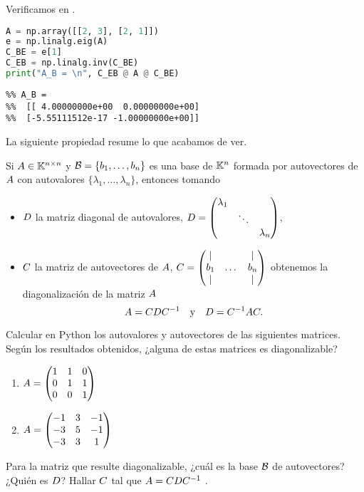 Verificamos en \python.

\begin{Shaded}
\begin{lstlisting}[language=python]
A = np.array([[2, 3], [2, 1]])
e = np.linalg.eig(A)
C_BE = e[1]
C_EB = np.linalg.inv(C_BE)
print("A_B = \n", C_EB @ A @ C_BE)
\end{lstlisting}
\end{Shaded}

\begin{verbatim}
%% A_B =
%%  [[ 4.00000000e+00  0.00000000e+00]
%%  [-5.55111512e-17 -1.00000000e+00]]
\end{verbatim}

La siguiente propiedad resume lo que acabamos de ver.

\begin{prop}
Si $\Ab \in \K^{n \times n}$ y $\B = \{\bb_1, \dots, \bb_n\}$
es una base de $\mathbb K^n$ formada por autovectores de $\Ab$ con autovalores
$\{\lambda_1, \dots, \lambda_n\}$, entonces tomando

\begin{itemize}
\item   $\Db$ la matriz diagonal de autovalores,
    $\Db = \begin{pmatrix} \lambda_1 & & \\ & \ddots & \\ & & \lambda_n \end{pmatrix}$,
\item   $\Cb$ la matriz de autovectores de $\Ab$,
    $\Cb = \begin{pmatrix} \vert & & \vert \\ \bb_1 & \dots & \bb_n \\ \vert & & \vert \end{pmatrix}$
obtenemos la diagonalización de la matriz $\Ab$
$$
\Ab = \Cb \Db \Cb^{-1} \quad \text{y} \quad \Db = \Cb^{-1} \Ab \Cb.
$$
\end{itemize}
\end{prop}

\begin{ejercicio} Calcular en Python los autovalores y autovectores de las
siguientes matrices. Según los resultados obtenidos, ¿alguna de estas
matrices es diagonalizable?

\begin{enumerate}
\item  $\Ab = \begin{pmatrix} 1 & 1 & 0 \\ 0 & 1 & 1 \\ 0 & 0 & 1 \end{pmatrix}$
\item  $\Ab = \begin{pmatrix} -1 & 3 & -1 \\ -3 & 5 & -1 \\ -3 & 3 & 1 \end{pmatrix}$
\end{enumerate}

Para la matriz que resulte diagonalizable, ¿cuál es la base $\mathcal B$ de
autovectores? ¿Quién es $\Db$? Hallar $\Cb$ tal que $\Ab = \Cb \Db \Cb^{-1}$ .

\end{ejercicio}

